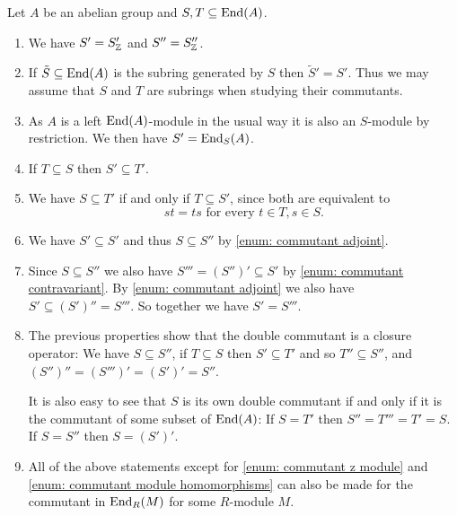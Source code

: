 \begin{rem}
  Let $A$ be an abelian group and $S, T \subseteq \operatorname{End}(A)$.
  \begin{enumerate}[label=\emph{\alph*}),leftmargin=*]
    \item \label{enum: commutant z module}
      We have $S' = S'_{\mathbb{Z}}$ and $S'' = S''_{\mathbb{Z}}$.
    \item
      If $\tilde{S} \subseteq \operatorname{End}(A)$ is the subring generated by $S$ then $\tilde{S}' = S'$. Thus we may assume that $S$ and $T$ are subrings when studying their commutants.
    \item \label{enum: commutant module homomorphisms}
      As $A$ is a left $\operatorname{End}(A)$-module in the usual way it is also an $S$-module by restriction. We then have $S' = \operatorname{End}_S(A)$.
    \item \label{enum: commutant contravariant}
      If $T \subseteq S$ then $S' \subseteq T'$.
    \item \label{enum: commutant adjoint}
      We have $S \subseteq T'$ if and only if $T \subseteq S'$, since both are equivalent to
      \[
        st = ts \text{ for every } t \in T, s \in S.
      \]
    \item
      We have $S' \subseteq S'$ and thus $S \subseteq S''$ by \ref{enum: commutant adjoint}.
    \item
      Since $S \subseteq S''$ we also have $S''' = (S'')' \subseteq S'$ by \ref{enum: commutant contravariant}. By \ref{enum: commutant adjoint} we also have $S' \subseteq (S')'' = S'''$. So together we have $S' = S'''$.
    \item
      The previous properties show that the double commutant is a closure operator: We have $S \subseteq S''$, if $T \subseteq S$ then $S' \subseteq T'$ and so $T'' \subseteq S''$, and $(S'')'' = (S''')' = (S')' = S''$.
      
      It is also easy to see that $S$ is its own double commutant if and only if it is the commutant of some subset of $\operatorname{End}(A)$: If $S = T'$ then $S'' = T''' = T' = S$. If $S = S''$ then $S = (S')'$.
    \item
      All of the above statements except for \ref{enum: commutant z module} and \ref{enum: commutant module homomorphisms} can also be made for the commutant in $\operatorname{End}_R(M)$ for some $R$-module $M$.
  \end{enumerate}
\end{rem}



